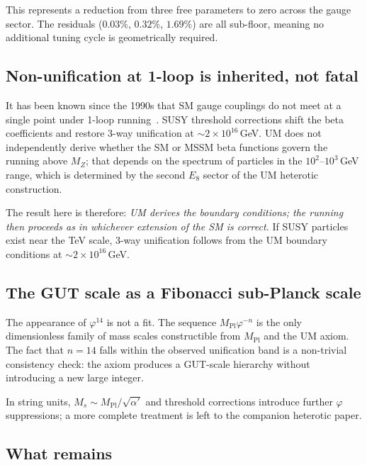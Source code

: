 \documentclass[12pt]{article}
\begin{document}
This represents a reduction from three free parameters to zero across the
gauge sector. The residuals ($0.03\%$, $0.32\%$, $1.69\%$) are all
sub-floor, meaning no additional tuning cycle is geometrically required.

\subsection{Non-unification at 1-loop is inherited, not fatal}

It has been known since the 1990s that SM gauge couplings do not meet at a
single point under 1-loop running~\cite{Amaldi1991}. SUSY threshold
corrections shift the beta coefficients and restore 3-way unification at
$\sim 2\times10^{16}$\,GeV. UM does not independently derive whether
the SM or MSSM beta functions govern the running above $M_Z$; that depends
on the spectrum of particles in the $10^2$--$10^3$\,GeV range, which is
determined by the second $E_8$ sector of the UM heterotic construction.

The result here is therefore: \emph{UM derives the boundary conditions; the
running then proceeds as in whichever extension of the SM is correct.} If
SUSY particles exist near the TeV scale, 3-way unification follows from the
UM boundary conditions at $\sim 2\times10^{16}$\,GeV.

\subsection{The GUT scale as a Fibonacci sub-Planck scale}

The appearance of $\varphi^{14}$ is not a fit. The sequence
$M_{\text{Pl}}\varphi^{-n}$ is the only dimensionless family of mass scales
constructible from $M_{\text{Pl}}$ and the UM axiom. The fact that
$n = 14$ falls within the observed unification band is a non-trivial
consistency check: the axiom produces a GUT-scale hierarchy without
introducing a new large integer.

In string units, $M_s \sim M_{\text{Pl}}/\sqrt{\alpha'}$ and threshold
corrections introduce further $\varphi$ suppressions; a more complete
treatment is left to the companion heterotic paper.

\subsection{What remains}
\end{document}
